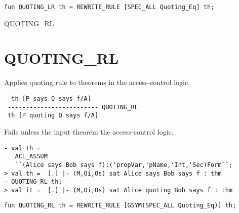\IMPLEMENTATION
\begin{holboxed}
\begin{verbatim}
fun QUOTING_LR th = REWRITE_RULE [SPEC_ALL Quoting_Eq] th;
\end{verbatim}
\end{holboxed}


\SEEALSO
QUOTING\_RL
\ENDDOC

\section{QUOTING\_RL}



\egroup

\SYNOPSIS
Applies quoting rule to theorems in the access-control logic.

\DESCRIBE
\begin{verbatim}
  th [P says Q says f/A]
 ------------------------- QUOTING_RL
 th [P quoting Q says f/A]
\end{verbatim}

\FAILURE
Fails unless the input theorem 
the access-control logic.

\EXAMPLE
\begin{holboxed}
\begin{verbatim}
- val th = 
   ACL_ASSUM 
   ``(Alice says Bob says f):('propVar,'pName,'Int,'Sec)Form``;
> val th =  [.] |- (M,Oi,Os) sat Alice says Bob says f : thm
- QUOTING_RL th;
> val it =  [.] |- (M,Oi,Os) sat Alice quoting Bob says f : thm
\end{verbatim}
\end{holboxed}

\IMPLEMENTATION
\begin{holboxed}
\begin{verbatim}
fun QUOTING_RL th = REWRITE_RULE [GSYM(SPEC_ALL Quoting_Eq)] th;
\end{verbatim}
\end{holboxed}


